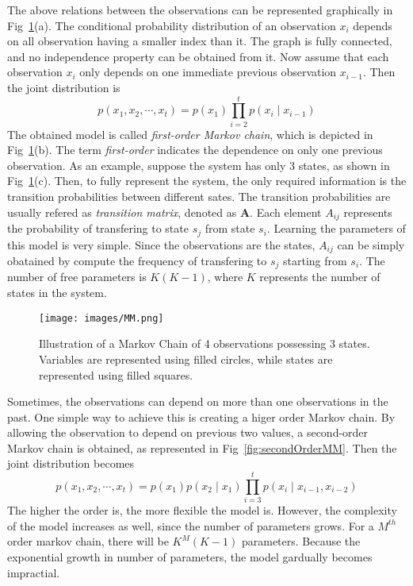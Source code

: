 The above relations between the observations can be represented graphically in Fig~\ref{fig:MM}(a). The conditional probability distribution of an observation \(x_i\) depends on all observation having a smaller index than it. The graph is fully connected, and no independence property can be obtained from it. Now assume that each observation \(x_i\) only depends on one immediate previous observation \(x_{i-1}\). Then the joint distribution is 
\begin{equation}
	p(x_1, x_2, \cdots, x_t) = p(x_1)\prod_{i = 2}^{t} p(x_i \mid x_{i-1})
\end{equation}
The obtained model is called \textit{first-order Markov chain}, which is depicted in Fig~\ref{fig:MM}(b). The term \textit{first-order} indicates the dependence on only one previous observation. As an example, suppose the system has only 3 states, as shown in Fig~\ref{fig:MM}(c). Then, to fully represent the system, the only required information is the transition probabilities between different sates. The transition probabilities are usually refered as \textit{transition matrix}, denoted as \(\mathbf{A}\). Each element \(A_{ij}\) represents the probability of transfering to state \(s_j\) from state \(s_i\). Learning the parameters of this model is very simple. Since the observations are the states, \(A_{ij}\) can be simply obatained by compute the frequency of transfering to \(s_j\) starting from \(s_i\). The number of free parameters is \(K(K-1)\), where \(K\) represents the number of states in the system.

\begin{figure}[ht]
	\begin{center}
		\texttt{[image: images/MM.png]}
		\caption{Illustration of a Markov Chain of 4 observations possessing 3 states. Variables are represented using filled circles, while states are represented using filled squares.}
		\label{fig:MM}
	\end{center}
\end{figure}

Sometimes, the observations can depend on more than one observations in the past. One simple way to achieve this is creating a higer order Markov chain. By allowing the observation to depend on previous two values, a second-order Markov chain is obtained, as represented in Fig~\ref{fig:secondOrderMM}. Then the joint distribution becomes
\begin{equation}
	p(x_1, x_2, \cdots, x_t) = p(x_1)p(x_2 \mid x_1)\prod_{i = 3}^{t} p(x_i \mid x_{i-1}, x_{i-2})
\end{equation}
The higher the order is, the more flexible the model is. However, the complexity of the model increases as well, since the number of parameters grows. For a \(M^{th}\) order markov chain, there will be \(K^{M}(K-1)\) parameters. Because the exponential growth in number of parameters, the model gardually becomes impractial. 

